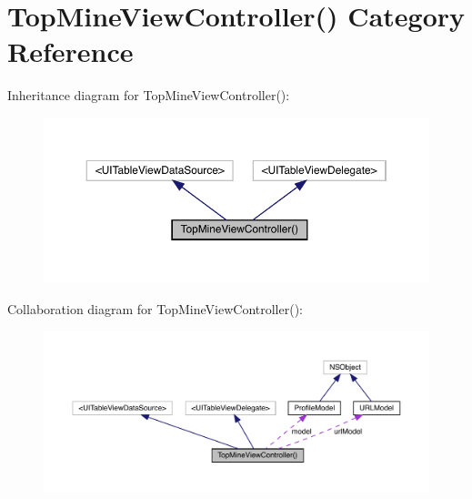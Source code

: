 \hypertarget{category_top_mine_view_controller_07_08}{}\section{Top\+Mine\+View\+Controller() Category Reference}
\label{category_top_mine_view_controller_07_08}


Inheritance diagram for Top\+Mine\+View\+Controller()\+:\nopagebreak
\begin{figure}[H]
\begin{center}
\leavevmode
\includegraphics[width=350pt]{category_top_mine_view_controller_07_08__inherit__graph}
\end{center}
\end{figure}


Collaboration diagram for Top\+Mine\+View\+Controller()\+:\nopagebreak
\begin{figure}[H]
\begin{center}
\leavevmode
\includegraphics[width=350pt]{category_top_mine_view_controller_07_08__coll__graph}
\end{center}
\end{figure}
